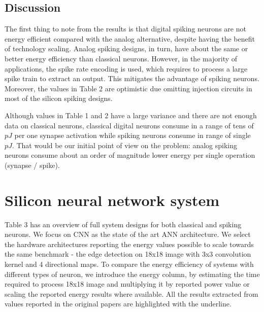 \documentclass[conference, compsoc]{IEEEtran}
\begin{document}
\subsection{Discussion}
The first thing to note from the results is that digital spiking neurons are not energy efficient compared with the analog alternative, despite having the benefit of technology scaling. Analog spiking designs, in turn, have about the same or better energy efficiency than classical neurons. However, in the majority of applications, the spike rate encoding is used, which requires to process a large spike train to extract an output. This mitigates the advantage of spiking neurons. Moreover, the values in Table 2 are optimistic due omitting injection circuits in most of the silicon spiking designs.

Although values in Table 1 and 2 have a large variance and there are not enough data on classical neurons, classical digital neurons consume in a range of tens of $ pJ $ per one synapse activation while spiking neurons consume in range of single $ pJ $. That would be our initial point of view on the problem: analog spiking neurons consume about an order of magnitude lower energy per single operation (synapse / spike). 

\section{Silicon neural network system}
Table 3 has an overview of full system designs for both classical and spiking neurons. We focus on CNN as the state of the art ANN architecture. We select the hardware architectures reporting the energy values possible to scale towards the same benchmark - the edge detection on 18x18 image with 3x3 convolution kernel and 4 directional maps. To compare the energy efficiency of systems with different types of neuron, we introduce the energy column, by estimating the time required to process 18x18 image and multiplying it by reported power value or scaling the reported energy results where available. All the results extracted from values reported in the original papers are highlighted with the underline.
\end{document}
